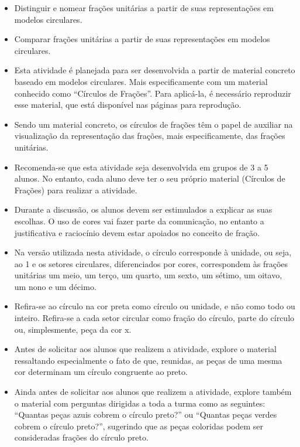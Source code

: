 \clearpage
\begin{atividade}\label{chap1-ativ11}
\objetivos
\begin{itemize}
 \item Distinguir e nomear frações unitárias a partir de suas representações em modelos circulares.
\item  Comparar frações unitárias a partir de suas representações em modelos circulares.
\end{itemize}

\discussoes
\begin{itemize}
\item    Esta atividade é planejada para ser desenvolvida a partir de material concreto baseado em modelos circulares. Mais especificamente com um material conhecido como ``Círculos de Frações''. Para aplicá-la, é necessário reproduzir esse material, que está disponível nas páginas para reprodução.
\item Sendo um material concreto, os círculos de frações têm o papel de auxiliar na visualização da representação das frações, mais especificamente, das frações unitárias.
\item Recomenda-se que esta atividade seja desenvolvida em grupos de 3 a 5 alunos. No entanto, cada aluno deve ter o seu próprio material (Círculos de Frações) para realizar a atividade.
\item Durante a discussão, os alunos devem ser estimulados a explicar as suas escolhas. O uso de cores vai fazer parte da comunicação, no entanto a justificativa e raciocínio devem estar apoiados no conceito de fração.
 \item Na versão utilizada nesta atividade, o círculo corresponde à unidade, ou seja, ao 1 e os setores circulares, diferenciados por cores, correspondem às frações unitárias um meio, um terço, um quarto, um sexto, um sétimo, um oitavo, um nono e um décimo.
    \item Refira-se ao círculo na cor preta como círculo ou unidade, e não como todo ou inteiro. Refira-se a cada setor circular como fração do círculo, parte do círculo ou, simplesmente, peça da cor x.
    \item Antes de solicitar aos alunos que realizem a atividade, explore o material ressaltando especialmente o fato de que, reunidas, as peças de uma mesma cor determinam um círculo congruente ao preto.
    \item Ainda antes de solicitar aos alunos que realizem a atividade, explore também o material com perguntas dirigidas a toda a turma como as seguintes: ``Quantas peças azuis cobrem o círculo preto?'' ou ``Quantas peças verdes cobrem o círculo preto?'', sugerindo que as peças coloridas podem ser consideradas frações do círculo preto.

\end{itemize}
\end{atividade}
